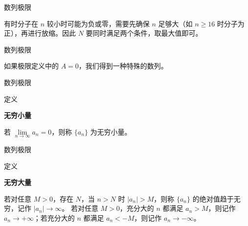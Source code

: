 \documentclass[aspectratio=169,10pt,fontset=fandol]{ctexbeamer}
\newenvironment{custom}[1]{\par\noindent\textbf{#1}\quad}{\par\vspace{0.8em}}
\begin{document}
\begin{frame}[t,fragile]{数列极限}
\footnotesize
{\footnotesize
有时分子在 \(n\) 较小时可能为负或零，需要先确保 \(n\) 足够大（如 \(n \geq 16\) 时分子为正），再进行放缩。因此 \(N\) 要同时满足两个条件，取最大值即可。

}
\end{frame}
\begin{frame}[t,fragile]{数列极限}
\footnotesize
{\footnotesize

如果极限定义中的 \(A = 0\)，我们得到一种特殊的数列。


}
\end{frame}
\begin{frame}[t,fragile]{数列极限}
\footnotesize
\begin{block}{定义}
{\footnotesize
\textbf{无穷小量}\par

	若 \(\lim\limits_{n\to\infty} a_n = 0\)，则称 \(\{a_n\}\) 为无穷小量。

}
\end{block}
\end{frame}
\begin{frame}[t,fragile]{数列极限}
\footnotesize
\begin{block}{定义}
{\footnotesize
\textbf{无穷大量}\par

	若对任意 \(M>0\)，存在 \(N\)，当 \(n>N\) 时 \(|a_n|>M\)，则称 \(\{a_n\}\) 的绝对值趋于无穷，记作 \(|a_n|\to\infty\)。
	若对任意 \(M>0\)，充分大的 \(n\) 都满足 \(a_n>M\)，则记作 \(a_n\to+\infty\)；若充分大的 \(n\) 都满足 \(a_n<-M\)，则记作 \(a_n\to-\infty\)。

}
\end{block}
\end{frame}
\end{document}
